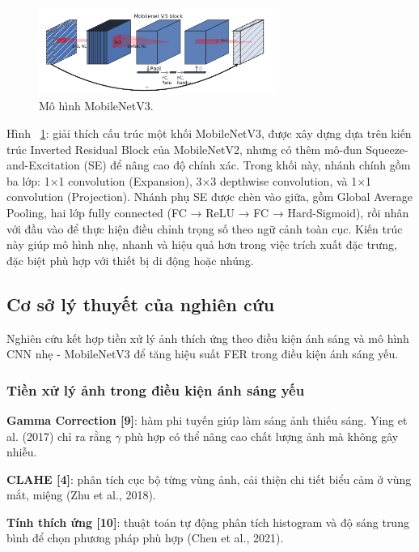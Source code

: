 \begin{figure}[H]
    \centering
    \includegraphics[width=0.7\textwidth]{img/mobinetv3.png} %
    \caption{Mô hình MobileNetV3.}
    \label{fig:emotion_distribution11}
\end{figure}

Hình ~\ref{fig:emotion_distribution11}: giải thích cấu trúc một khối MobileNetV3, được xây dựng dựa trên kiến trúc Inverted Residual Block của MobileNetV2, nhưng có thêm mô-đun Squeeze-and-Excitation (SE) để nâng cao độ chính xác. Trong khối này, nhánh chính gồm ba lớp: 1×1 convolution (Expansion), 3×3 depthwise convolution, và 1×1 convolution (Projection). Nhánh phụ SE được chèn vào giữa, gồm Global Average Pooling, hai lớp fully connected (FC → ReLU → FC → Hard-Sigmoid), rồi nhân với đầu vào để thực hiện điều chỉnh trọng số theo ngữ cảnh toàn cục. Kiến trúc này giúp mô hình nhẹ, nhanh và hiệu quả hơn trong việc trích xuất đặc trưng, đặc biệt phù hợp với thiết bị di động hoặc nhúng.


\subsection{Cơ sở lý thuyết của nghiên cứu}
Nghiên cứu kết hợp tiền xử lý ảnh thích ứng theo điều kiện ánh sáng và mô hình CNN nhẹ - MobileNetV3 để tăng hiệu suất FER trong điều kiện ánh sáng yếu.

\subsubsection{Tiền xử lý ảnh trong điều kiện ánh sáng yếu}
\textbf{Gamma Correction [9]}: hàm phi tuyến giúp làm sáng ảnh thiếu sáng. Ying et al. (2017) chỉ ra rằng \(\gamma\) phù hợp có thể nâng cao chất lượng ảnh mà không gây nhiễu.\par
\textbf{CLAHE [4]}: phân tích cục bộ từng vùng ảnh, cải thiện chi tiết biểu cảm ở vùng mắt, miệng (Zhu et al., 2018).\par
\textbf{Tính thích ứng [10]}: thuật toán tự động phân tích histogram và độ sáng trung bình để chọn phương pháp phù hợp (Chen et al., 2021).

